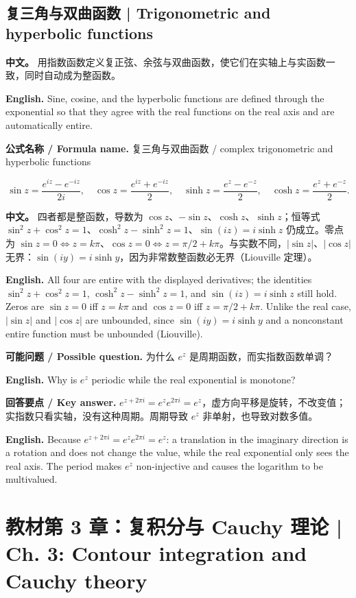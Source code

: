 \documentclass[UTF8,11pt,a4paper]{ctexart}
\newcommand{\EN}[1]{\par\noindent \textbf{English.} #1\par}
\newcommand{\FORMULA}[2]{\par\noindent\textbf{公式名称 / Formula name.} #1 / #2\par}
\newcommand{\ASK}[4]{\par\noindent \textbf{可能问题 / Possible question.} #1\par\EN{#2}\noindent \textbf{回答要点 / Key answer.} #3\par\EN{#4}\medskip}
\newcommand{\APS}[2]{\par\noindent\textbf{中文。} #1\par\noindent\textbf{English.} #2\par\smallskip}
\begin{document}
\subsection{复三角与双曲函数 | Trigonometric and hyperbolic functions}
\APS{用指数函数定义复正弦、余弦与双曲函数，使它们在实轴上与实函数一致，同时自动成为整函数。}{Sine, cosine, and the hyperbolic functions are defined through the exponential so that they agree with the real functions on the real axis and are automatically entire.}
\FORMULA{复三角与双曲函数}{complex trigonometric and hyperbolic functions}
\[
\sin z=\frac{e^{iz}-e^{-iz}}{2i},\quad
\cos z=\frac{e^{iz}+e^{-iz}}2,\quad
\sinh z=\frac{e^z-e^{-z}}2,\quad
\cosh z=\frac{e^z+e^{-z}}2.
\]
\APS{四者都是整函数，导数为 $\cos z$、$-\sin z$、$\cosh z$、$\sinh z$；恒等式 $\sin^2z+\cos^2z=1$、$\cosh^2z-\sinh^2z=1$、$\sin(iz)=i\sinh z$ 仍成立。零点为 $\sin z=0\iff z=k\pi$、$\cos z=0\iff z=\pi/2+k\pi$。与实数不同，$|\sin z|$、$|\cos z|$ 无界：$\sin(iy)=i\sinh y$，因为非常数整函数必无界（Liouville 定理）。}{All four are entire with the displayed derivatives; the identities $\sin^2z+\cos^2z=1$, $\cosh^2z-\sinh^2z=1$, and $\sin(iz)=i\sinh z$ still hold. Zeros are $\sin z=0$ iff $z=k\pi$ and $\cos z=0$ iff $z=\pi/2+k\pi$. Unlike the real case, $|\sin z|$ and $|\cos z|$ are unbounded, since $\sin(iy)=i\sinh y$ and a nonconstant entire function must be unbounded (Liouville).}
\ASK{为什么 $e^z$ 是周期函数，而实指数函数单调？}{Why is $e^z$ periodic while the real exponential is monotone?}{$e^{z+2\pi i}=e^z e^{2\pi i}=e^z$，虚方向平移是旋转，不改变值；实指数只看实轴，没有这种周期。周期导致 $e^z$ 非单射，也导致对数多值。}{Because $e^{z+2\pi i}=e^z e^{2\pi i}=e^z$: a translation in the imaginary direction is a rotation and does not change the value, while the real exponential only sees the real axis. The period makes $e^z$ non-injective and causes the logarithm to be multivalued.}
\section[教材第 3 章 复积分]{教材第 3 章：复积分与 Cauchy 理论 | Ch. 3: Contour integration and Cauchy theory}
\end{document}
